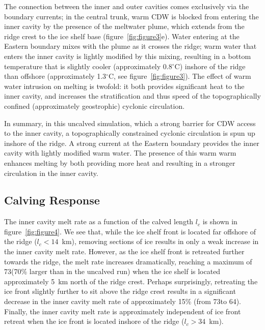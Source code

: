 \documentclass[draft]{agujournal2019}
\begin{document}
The connection between the inner and outer cavities comes exclusively via the boundary currents; in the central trunk, warm CDW is blocked from entering the inner cavity by the presence of the meltwater plume, which extends from the ridge crest to the ice shelf base (figure~\ref{fig:figure3}e). Water entering at the Eastern boundary mixes with the plume as it crosses the ridge; warm water that enters the inner cavity is lightly modified by this mixing, resulting in a bottom temperature that is slightly cooler (approximately 0.8${}^\circ$C) inshore of the ridge than offshore (approximately 1.3${}^\circ$C, see figure~\ref{fig:figure3}). The effect of warm water intrusion on melting is twofold: it both provides significant heat to the inner cavity, and increases the stratification and thus speed of the topographically confined (approximately geostrophic) cyclonic circulation.

In summary, in this uncalved simulation, which a strong barrier for CDW access to the inner cavity, a topographically constrained cyclonic circulation is spun up inshore of the ridge. A strong current at the Eastern boundary provides the inner cavity with lightly modified warm water. The presence of this warm warm enhances melting by both providing more heat and resulting in a stronger circulation in the inner cavity. %

\subsection{Calving Response}
The inner cavity melt rate as a function of the calved length $l_c$ is shown in figure~\ref{fig:figure4}. We see that, while the ice shelf front is located far offshore of the ridge ($l_c < 14$~km), removing sections of ice results in only a weak increase in the inner cavity melt rate. However, as the ice shelf front is retreated further towards the ridge, the melt rate increases dramatically, reaching a maximum of 73\mpryr (70\% larger than in the uncalved run) when the ice shelf is located approximately 5~km north of the ridge crest. Perhaps surprisingly, retreating the ice front slightly further to sit above the ridge crest results in a significant decrease in the inner cavity melt rate of approximately 15\% (from 73\mpryr to 64\mpryr). Finally, the inner cavity melt rate is approximately independent of ice front retreat when the ice front is located inshore of the ridge ($l_c>$34~km).
\end{document}
